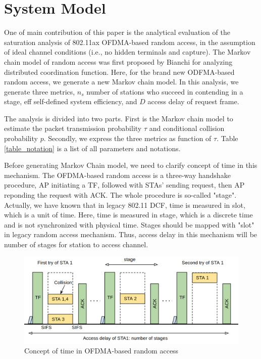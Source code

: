 \chapter{System Model} 		\label{chp_sys_model}
One of main contribution of this paper is the analytical evaluation of the saturation analysis of 802.11ax OFDMA-based random access, in the assumption of ideal channel conditions (i.e., no hidden terminals and capture). 
The Markov chain model of random access was first proposed by Bianchi for analyzing distributed coordination function\cite{bianchi2000performance}. 
Here, for the brand new ODFMA-based random access, we generate a new Markov chain model. 
In this analysis, we generate three metrics, $n_s$ number of stations who succeed in contending in a stage, eff self-defined system efficiency, and $D$ access delay of request frame. 

The analysis is divided into two parts. First is the Markov chain model to estimate the packet transmission probability $\tau$ and conditional collision probability $p$. 
Secondly, we express the three metrics as function of $\tau$. 
Table \ref{table_notation} is a list of all parameters and notations.

Before generating Markov Chain model, we need to clarify concept of time in this mechanism.
The OFDMA-based random access is a three-way handshake procedure, AP initiating a TF, followed with STAs' sending request, then AP reponding the request with ACK.
The whole procedure is so-called "stage".
Actually, we have known that in legacy 802.11 DCF, time is measured in slot, which is a unit of time.
Here, time is measured in stage, which is a discrete time and is not synchronized with physical time. 
Stages should be mapped with "slot" in legacy random access mechanism.
Thus, access delay in this mechanism will be number of stages for station to access channel.

\begin{figure}[!t]
\centering
\includegraphics[scale=0.27]{./figure/chp3/ra_time.png}
\caption{Concept of time in OFDMA-based random access}
\label{fig_ra_time}
\end{figure}



